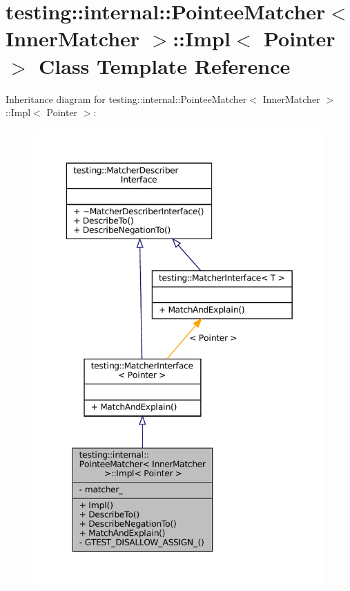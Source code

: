 \hypertarget{classtesting_1_1internal_1_1PointeeMatcher_1_1Impl}{}\section{testing\+:\+:internal\+:\+:Pointee\+Matcher$<$ Inner\+Matcher $>$\+:\+:Impl$<$ Pointer $>$ Class Template Reference}
\label{classtesting_1_1internal_1_1PointeeMatcher_1_1Impl}


Inheritance diagram for testing\+:\+:internal\+:\+:Pointee\+Matcher$<$ Inner\+Matcher $>$\+:\+:Impl$<$ Pointer $>$\+:
\nopagebreak
\begin{figure}[H]
\begin{center}
\leavevmode
\includegraphics[width=349pt]{classtesting_1_1internal_1_1PointeeMatcher_1_1Impl__inherit__graph}
\end{center}
\end{figure}


